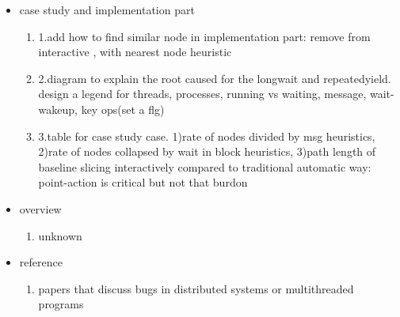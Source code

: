 \begin{itemize}
\item case study and implementation part
	\begin{enumerate}
 	\item 1.add how to find similar node in implementation part: remove from interactive , with nearest node heuristic
 	\item 2.diagram to explain the root caused for the longwait and repeatedyield. design a legend for threads, processes, running vs waiting, message, wait-wakeup, key ops(set a flg)
	\item 3.table for case study case. 
		1)rate of nodes divided by msg heuristics,
		2)rate of nodes collapsed by wait in block heuristics,
		3)path length of baseline slicing interactively compared to traditional automatic way: point-action is critical but not that burdon
	\end{enumerate}
\item overview
	\begin{enumerate}
	\item unknown
	\end{enumerate}
\item reference
	\begin{enumerate}
	\item papers that discuss bugs in distributed systems or multithreaded programs
	\end{enumerate}
\end{itemize}
